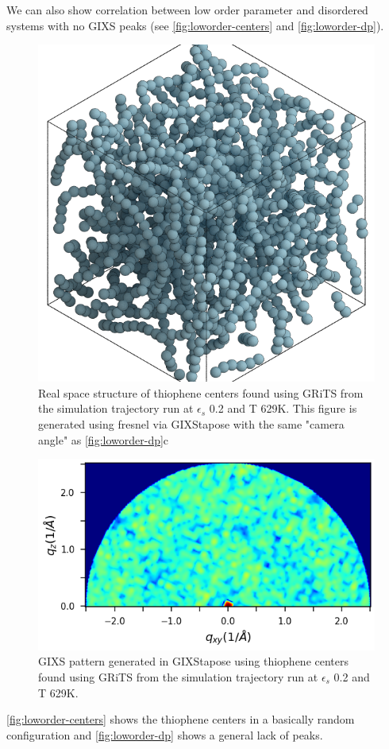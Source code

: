 We can also show correlation between low order parameter and disordered systems with no GIXS peaks (see \autoref{fig:loworder-centers} and \autoref{fig:loworder-dp}).
\begin{figure}
    \centering
    \includegraphics[width=0.8\linewidth]{figures/p3ht_val/cg-trajectory-amorphous_scene.png}
    \caption{Real space structure of thiophene centers found using GRiTS from the simulation trajectory run at $\epsilon_{s}$ 0.2 and T 629K. This figure is generated using fresnel via GIXStapose with the same "camera angle" as \autoref{fig:loworder-dp}c}\label{fig:loworder-centers}
\end{figure}
\begin{figure}
    \centering
    \includegraphics[width=0.8\linewidth]{figures/opa_notebook/Order_parameter_analysis_21_0.png}
    \caption{GIXS pattern generated in GIXStapose using thiophene centers found using GRiTS from the simulation trajectory run at $\epsilon_{s}$ 0.2 and T 629K.}\label{fig:loworder-dp}
\end{figure}
\autoref{fig:loworder-centers} shows the thiophene centers in a basically random configuration and \autoref{fig:loworder-dp} shows a general lack of peaks.

